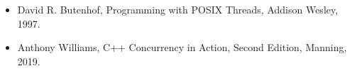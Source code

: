 \begin{itemize}
\item
David R. Butenhof, Programming with POSIX Threads, Addison Wesley, 1997.

\item
Anthony Williams, C++ Concurrency in Action, Second Edition, Manning, 2019.
\end{itemize}